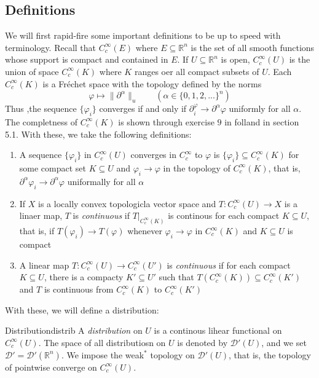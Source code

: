 \documentclass{book}
\newcommand{\R}{{\mathbb{R}}}
\newcommand{\CD}{{\mathcal{D}}}
\newcommand{\sse}{\subseteq}
\renewcommand{\phi}{\varphi}
\newcommand{\rw}{\rightarrow}
\begin{document}
\subsection{Definitions}

We will first rapid-fire some important definitions to be up to speed with terminology. Recall that $C_c^\infty(E)$
where $E \sse \R^n$ is the set of all smooth functions whose support is compact and contained in $E$. If $U \sse \R^n$
is open, $C_c^\infty(U)$ is the union of space $C_c^\infty(K)$ where $K$ ranges oer all compact subsets of $U$. Each
$C_c^\infty(K)$ is a Fr\'echet space with the topology defined by the norms
\[
	\phi \mapsto \|  \partial^\alpha\|_u \qquad (\alpha \in \{0,1,2,...\}^n)
\]
Thus ,the sequence $\{\phi_i\}$ converges if and only if $  \partial^ \phi_i \rw  \partial^\alpha \phi$ uniformly for
all $\alpha$. The completness of $C_c^\infty(K)$ is shown through exercise $9$ in folland in section 5.1. With these, we
take the following definitions:
\begin{enumerate}
	\item  A sequence $\{\phi_i\}$ in $C_c^\infty(U)$ converges in $C_c^\infty$ to $\phi$ is $\{\phi_i\} \sse
		C_c^\infty(K)$ for some compact set $K \sse U$ and $\phi_i \rw \phi$ in the topology of $C_c^\infty(K)$, that
		is, $  \partial^\alpha \phi_i \rw  \partial^\alpha \phi$ uniformally for all $\alpha$
	\item If $X$ is a locally convex topologicla vector space and $T: C_c^\infty(U) \rw X$ is a linaer map, $T$ is
		\emph{continuous} if $T|_{C_c^\infty(K)}$ is continous for each compact $K \sse U$, that is, if $T(\phi_i) \rw
		T(\phi)$ whenever $\phi_i \rw \phi$ in $C_c^\infty(K)$ and $K \sse U$ is compact
	\item A linear map $T: C_c^\infty(U) \rw C_c^\infty(U')$ is \emph{continuous} if for each compact $K \sse U$, there
		is a compacty $K' \sse U'$ such that $T(C_c^\infty(K)) \sse C_c^\infty(K')$ and $T$ is continuous from
		$C_c^\infty(K)$ to $C_c^\infty(K')$
\end{enumerate}

With these, we will define a distribution:

\begin{defn}{Distribution}{distrib}
	A \emph{distribution} on $U$ is a continous lihear functional on $C_c^\infty(U)$. The space of all distributiosn on
	$U$ is denoted by $\CD'(U)$, and we set $\CD' = \CD'(\R^n)$. We impose the weak$^*$ topology on $\CD'(U)$, that is,
	the topology of pointwise converge on $C_c^\infty(U)$.
\end{defn}
\end{document}
